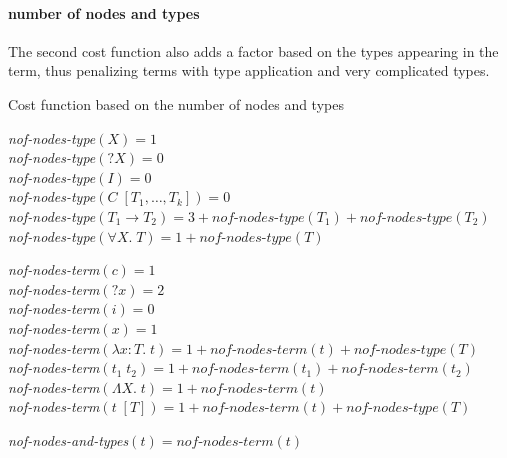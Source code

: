   \paragraph{number of nodes and types}
The second cost function also adds a factor based on the types appearing in the term, thus penalizing terms with type application and very complicated types.
%
\begin{algorithm}
\caption{Cost function based on the number of nodes and types}

\textit{nof-nodes-type}$(X) = 1$\\
\textit{nof-nodes-type}$({?X}) = 0$\\
\textit{nof-nodes-type}$(I) = 0$\\
\textit{nof-nodes-type}$(C\; [T_1, \ldots, T_k]) = 0$\\
\textit{nof-nodes-type}$(T_1 \rightarrow T_2) = 3 + \textit{nof-nodes-type}(T_1) + \textit{nof-nodes-type}(T_2)$\\
\textit{nof-nodes-type}$(\forall X.\; T) = 1 + \textit{nof-nodes-type}(T)$\\

\BlankLine

\textit{nof-nodes-term}$(c) = 1$\\
\textit{nof-nodes-term}$({?x}) = 2$\\
\textit{nof-nodes-term}$(i) = 0$\\
\textit{nof-nodes-term}$(x) = 1$\\
\textit{nof-nodes-term}$(\lambda x : T.\; t) = 1 + \textit{nof-nodes-term}(t) + \textit{nof-nodes-type}(T)$\\
\textit{nof-nodes-term}$(t_1\; t_2) = 1 + \textit{nof-nodes-term}(t_1) + \textit{nof-nodes-term}(t_2)$\\
\textit{nof-nodes-term}$(\Lambda X.\; t) = 1 + \textit{nof-nodes-term}(t)$\\
\textit{nof-nodes-term}$(t\; [T]) = 1 + \textit{nof-nodes-term}(t) + \textit{nof-nodes-type}(T)$\\

\BlankLine

\textit{nof-nodes-and-types}$(t) = \textit{nof-nodes-term}(t)$
\end{algorithm} 
%

